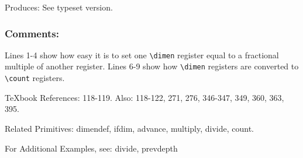 Produces: See typeset version.

\subsubsection{Comments:}

Lines 1-4 show how easy it is to set one \verb|\dimen| register equal to a
fractional multiple of another register.  Lines 6-9 show how \verb|\dimen|
registers are converted to \verb|\count| registers.

TeXbook References: 118-119. Also: 118-122, 271, 276, 346-347, 349, 360, 363, 395.

Related Primitives: dimendef, ifdim, advance, multiply, divide, count.

For Additional Examples, see: divide, prevdepth 
